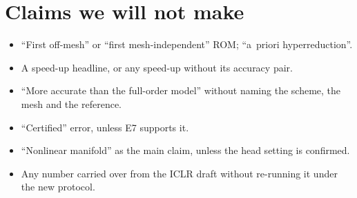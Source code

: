 \documentclass[11pt]{article}
\newcommand{\E}[1]{\textsf{\small E#1}}
\begin{document}
\section{Claims we will not make}
\begin{itemize}
\item ``First off-mesh'' or ``first mesh-independent'' ROM; ``a~priori hyperreduction''.
\item A speed-up headline, or any speed-up without its accuracy pair.
\item ``More accurate than the full-order model'' without naming the scheme, the mesh and the reference.
\item ``Certified'' error, unless \E{7} supports it.
\item ``Nonlinear manifold'' as the main claim, unless the head setting is confirmed.
\item Any number carried over from the ICLR draft without re-running it under the new protocol.
\end{itemize}
\end{document}
